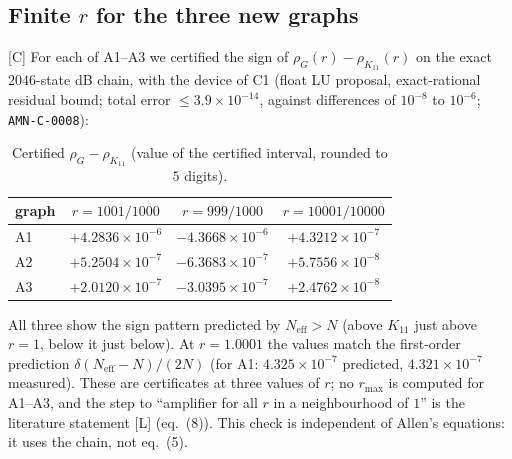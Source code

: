 \documentclass[10pt]{article}
\newcommand{\tier}[1]{\textsf{[#1]}}
\newcommand{\tL}{\tier{L}}
\newcommand{\tC}{\tier{C}}
\newcommand{\Neff}{N_{\mathrm{eff}}}
\begin{document}
\subsection{Finite $r$ for the three new graphs}
\tC{} For each of A1--A3 we certified the sign of $\rho_G(r)-\rho_{K_{11}}(r)$ on the exact $2046$-state dB chain, with the device of C1 (float LU proposal, exact-rational residual bound; total error $\le3.9\times10^{-14}$, against differences of $10^{-8}$ to $10^{-6}$; \texttt{AMN-C-0008}):
\begin{table}[h]\centering\small
\caption{Certified $\rho_G-\rho_{K_{11}}$ (value of the certified interval, rounded to $5$ digits).}
\begin{tabular}{lccc}\toprule
graph & $r=1001/1000$ & $r=999/1000$ & $r=10001/10000$\\\midrule
A1 & $+4.2836\times10^{-6}$ & $-4.3668\times10^{-6}$ & $+4.3212\times10^{-7}$\\
A2 & $+5.2504\times10^{-7}$ & $-6.3683\times10^{-7}$ & $+5.7556\times10^{-8}$\\
A3 & $+2.0120\times10^{-7}$ & $-3.0395\times10^{-7}$ & $+2.4762\times10^{-8}$\\\bottomrule
\end{tabular}
\end{table}
All three show the sign pattern predicted by $\Neff>N$ (above $K_{11}$ just above $r=1$, below it just below). At $r=1.0001$ the values match the first-order prediction $\delta(\Neff-N)/(2N)$ (for A1: $4.325\times10^{-7}$ predicted, $4.321\times10^{-7}$ measured). These are certificates at three values of $r$; no $r_{\max}$ is computed for A1--A3, and the step to ``amplifier for all $r$ in a neighbourhood of $1$'' is the literature statement \tL{} (eq.~(8)). This check is independent of Allen's equations: it uses the chain, not eq.~(5).

\end{document}
